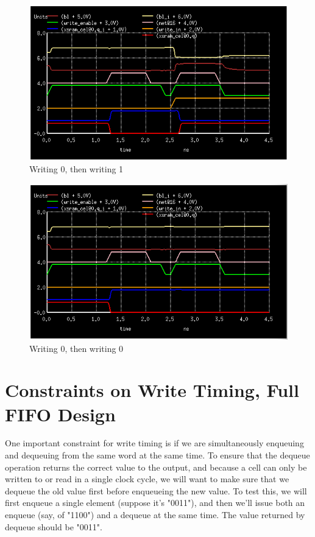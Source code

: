 \documentclass[12pt]{report}
\begin{document}
\begin{figure}[H]
  \centering
    \includegraphics[width=1.0\textwidth]{write_0_then_write_1.png}
  \caption{Writing 0, then writing 1}
  \label{fig:write_0_then_write_1}
\end{figure}

\begin{figure}[H]
  \centering
    \includegraphics[width=1.0\textwidth]{write_0_then_write_0.png}
  \caption{Writing 0, then writing 0}
  \label{fig:write_0_then_write_0}
\end{figure}

\section*{Constraints on Write Timing, Full FIFO Design}
One important constraint for write timing is if we are simultaneously enqueuing and dequeuing from the same word at the same time. To ensure that the dequeue operation returns the correct value to the output, and because a cell can only be written to or read in a single clock cycle, we will want to make sure that we dequeue the old value first before enqueueing the new value. To test this, we will first enqueue a single element (suppose it's "0011"), and then we'll issue both an enqueue (say, of "1100") and a dequeue at the same time. The value returned by dequeue should be "0011".
\end{document}
